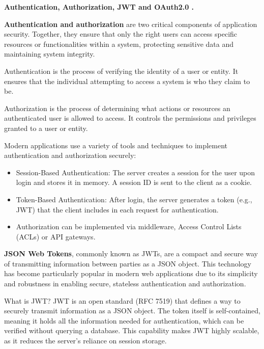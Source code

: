 
\pagebreak
\begin{center}
\textbf{Authentication, Authorization, JWT and OAuth2.0 .}
\end{center}

\medskip

\textbf{Authentication and authorization} are two critical components of application security. Together, they ensure that only the right users can access specific resources or functionalities within a system, protecting sensitive data and maintaining system integrity.

Authentication is the process of verifying the identity of a user or entity. It ensures that the individual attempting to access a system is who they claim to be.

Authorization is the process of determining what actions or resources an authenticated user is allowed to access. It controls the permissions and privileges granted to a user or entity.

Modern applications use a variety of tools and techniques to implement authentication and authorization securely:

\begin{itemize}
\item Session-Based Authentication: The server creates a session for the user upon login and stores it in memory. A session ID is sent to the client as a cookie.
    
\item Token-Based Authentication: After login, the server generates a token (e.g., JWT) that the client includes in each request for authentication.
    
\item Authorization can be implemented via middleware, Access Control Lists (ACLs) or API gateways.
\end{itemize}


\textbf{JSON Web Tokens}, commonly known as JWTs, are a compact and secure way of transmitting information between parties as a JSON object. This technology has become particularly popular in modern web applications due to its simplicity and robustness in enabling secure, stateless authentication and authorization.

What is JWT?
JWT is an open standard (RFC 7519) that defines a way to securely transmit information as a JSON object. The token itself is self-contained, meaning it holds all the information needed for authentication, which can be verified without querying a database. This capability makes JWT highly scalable, as it reduces the server's reliance on session storage.


